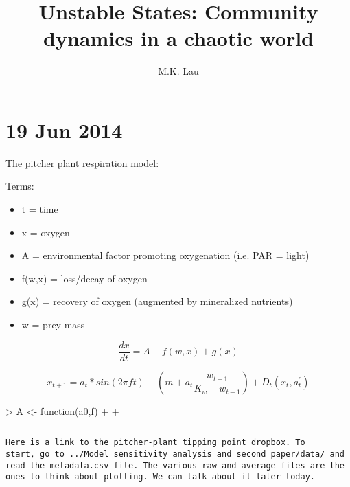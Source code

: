 \documentclass[12pt]{article}
\title{Unstable States: Community dynamics in a chaotic world}
\author{M.K. Lau}
\begin{document}
\maketitle



\section{19 Jun 2014}

The pitcher plant respiration model:

Terms:

\begin{itemize}
\item t = time
\item x = oxygen
\item A = environmental factor promoting oxygenation (i.e. PAR = light)
\item f(w,x) = loss/decay of oxygen 
\item g(x) = recovery of oxygen (augmented by mineralized nutrients)
\item w = prey mass
\end{itemize}

\begin{equation}
  \frac{dx}{dt}  = A - f(w,x) + g(x)
\end{equation}

\begin{equation}
  x_{t+1} = a_t * sin(2 \pi f t) -  (m + a_t \frac{w_{t-1}}{K_w +
    w_{t-1}}) + D_t(x_t,a^{\prime}_t)
\end{equation}



\begin{Schunk}
\begin{Sinput}
>   A <- function(a0,f){
+     
+   }
\end{Sinput}
\end{Schunk}

\begin{equation}
  
\end{equation}

\begin{verbatim}
Here is a link to the pitcher-plant tipping point dropbox. To
start, go to ../Model sensitivity analysis and second paper/data/ and
read the metadata.csv file. The various raw and average files are the
ones to think about plotting. We can talk about it later today.
\end{verbatim}
\end{document}
